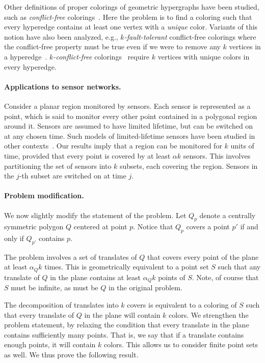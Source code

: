 \documentclass[english,11pt]{article}
\begin{document}
Other definitions of proper colorings of geometric hypergraphs have been studied, such as \emph{conflict-free} colorings~\cite{shakharcf}. 
Here the problem is to find a coloring such that every hyperedge contains at least one vertex with a \emph{unique} color.
Variants of this notion have also been analyzed, e.g., \emph{$k$-fault-tolerant} conflict-free colorings where the conflict-free property must be true even if we were to remove any $k$ vertices in a hyperedge~\cite{faulttolerant}. \emph{$k$-conflict-free} colorings~\cite{jithamilton} require $k$ vertices with unique colors in every hyperedge. 

\paragraph{Applications to sensor networks.}
Consider a planar region monitored by sensors. Each sensor is represented as a point, which is said to monitor every other point contained in a polygonal region around it. Sensors are assumed to have limited lifetime, but can be switched on at any chosen time. Such models of limited-lifetime sensors have been studied in other contexts~\cite{othersensors}. Our results imply that a region can be monitored for $k$ units of time, provided that every point is covered by at least $\alpha k$ sensors. This involves partitioning the set of sensors into $k$ subsets, each covering the region. Sensors in the 
$j$-th subset are switched on at time $j$. 

\paragraph{Problem modification.}
We now slightly modify the statement of the problem.  Let $Q_p$ denote a centrally symmetric polygon $Q$ centered at point $p$.  Notice that $Q_p$ covers a point $p'$ if and only if $Q_{p'}$ contains $p$.
 
The problem involves a set of translates of $Q$ that covers every point of the plane  at least $\alpha_Q k$ times. 
This is geometrically equivalent to a point set $S$ such that any translate of $Q$ in the plane contains at least $\alpha_Q k$ points of $S$.    
Note, of course that $S$ must be infinite, as must be $Q$ in the original problem.

The decomposition of translates into $k$ covers is equivalent to a coloring of $S$ such that every translate of $Q$ in the plane will contain $k$ colors.
We strengthen the problem statement, by relaxing the condition that every translate in the plane contains sufficiently many points.  That is, we say that if a translate contains enough points, it will contain $k$ colors. This allows us to consider finite point sets as well. 
We thus prove the following result.
\end{document}
